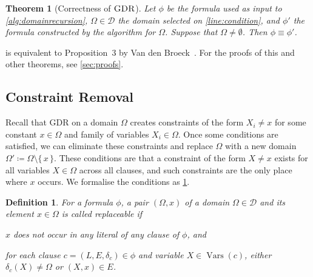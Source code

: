 \documentclass{article}
\newtheorem{theorem}{Theorem}
\newtheorem{definition}{Definition}
\DeclareMathOperator{\GDR}{\textsc{GDR}}
\DeclareMathOperator{\Vars}{Vars}
\begin{document}
\begin{theorem}[Correctness of $\GDR$]\label{thm:correctness1}
  Let $\phi$ be the formula used as input to \cref{alg:domainrecursion},
  $\Omega \in \mathcal{D}$ the domain selected on \cref{line:condition}, and
  $\phi'$ the formula constructed by the algorithm for $\Omega$. Suppose that
  $\Omega \ne \emptyset$. Then $\phi \equiv \phi'$.
\end{theorem}

 is equivalent to Proposition~3 by Van den
Broeck~. For the proofs of this and other
theorems, see \cref{sec:proofs}.

\subsection{Constraint Removal}\label{sec:cr}

Recall that GDR on a domain $\Omega$ creates constraints of the form $X_i \ne x$
for some constant $x \in \Omega$ and family of variables $X_i \in \Omega$. Once
some conditions are satisfied, we can eliminate these constraints and replace
$\Omega$ with a new domain $\Omega' \coloneqq \Omega \setminus \{\, x \,\}$.
These conditions are that a constraint of the form $X \ne x$ exists for all
variables $X \in \Omega$ across all clauses, and such constraints are the only
place where $x$ occurs. We formalise the conditions as \cref{def:replaceable}.

\begin{definition}\label{def:replaceable}
  For a formula $\phi$, a pair $(\Omega, x)$ of a domain
  $\Omega \in \mathcal{D}$ and its element $x \in \Omega$ is called
  \emph{replaceable} if
  \begin{enumerate*}[label=(\roman*)]
    \item $x$ does not occur in any literal of any clause of $\phi$, and
    \item for each clause $c = (L, E, \delta_c) \in \phi$ and variable
    $X \in \Vars(c)$, either $\delta_c(X) \ne \Omega$ or $(X, x) \in E$.
  \end{enumerate*}
\end{definition}
\end{document}
